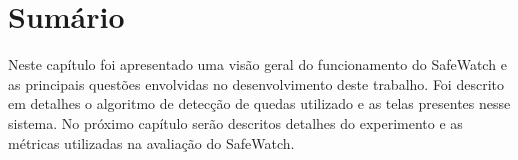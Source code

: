 \section{Sumário}
Neste capítulo foi apresentado uma visão geral do funcionamento do SafeWatch e as principais questões envolvidas no desenvolvimento deste trabalho. Foi descrito em detalhes o algoritmo de detecção de quedas utilizado e as telas presentes nesse sistema.  No próximo capítulo serão descritos detalhes do experimento e as métricas utilizadas na avaliação do SafeWatch. 


